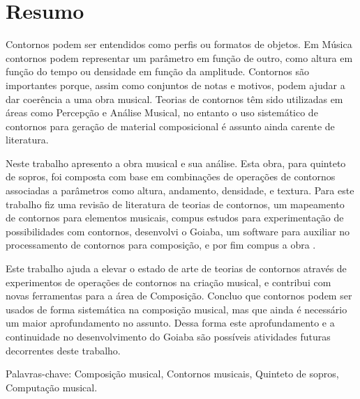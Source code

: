 \chapter*{Resumo}
\label{cha:resumo}

Contornos podem ser entendidos como perfis ou formatos de objetos. Em
Música contornos podem representar um parâmetro em função de outro,
como altura em função do tempo ou densidade em função da
amplitude. Contornos são importantes porque, assim como conjuntos de
notas e motivos, podem ajudar a dar coerência a uma obra musical.
Teorias de contornos têm sido utilizadas em áreas como Percepção e
Análise Musical, no entanto o uso sistemático de contornos para
geração de material composicional é assunto ainda carente de
literatura.

Neste trabalho apresento a obra musical \obra{} e sua análise. Esta
obra, para quinteto de sopros, foi composta com base em combinações de
operações de contornos associadas a parâmetros como altura, andamento,
densidade, e textura.
Para este trabalho fiz uma revisão de literatura de teorias de
contornos, um mapeamento de contornos para elementos musicais, compus
estudos para experimentação de possibilidades com contornos,
desenvolvi o Goiaba, um software para auxiliar no processamento de
contornos para composição, e por fim compus a obra \obra{}.

Este trabalho ajuda a elevar o estado de arte de teorias de contornos
através de experimentos de operações de contornos na criação musical,
e contribui com novas ferramentas para a área de Composição.
Concluo que contornos podem ser usados de forma sistemática na
composição musical, mas que ainda é necessário um maior aprofundamento
no assunto. Dessa forma este aprofundamento e a continuidade no
desenvolvimento do Goiaba são possíveis atividades futuras decorrentes
deste trabalho.

Palavras-chave: Composição musical, Contornos musicais, Quinteto de
sopros, Computação musical.
